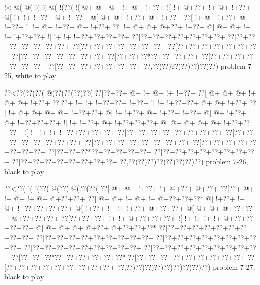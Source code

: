 \vbox{\vbox{\goo
\- !<\- @(\- @(\- !(\- !(\- @(\- !(\0??(
\- ![\- @+\- @+\- @+\- !+\- @+\- !+\0??+
\- ![\- !+\- @+\0??+\- !+\- @+\- !+\0??+
\- @[\- !+\- !+\- !+\0??+\- @+\- !+\0??+
\- @[\- @+\- @+\- !+\0??+\- @+\- !+\0??+
\0??[\- !+\- @+\- !+\0??+\- @+\- !+\0??+
\- ![\- !+\- @+\- !+\0??+\- @+\- !+\0??+
\0??[\- !+\- @+\- @+\- @+\0??+\- !+\0??+
\- @[\- @+\- @+\- !+\- !+\- !+\0??+\0??+
\- ![\- !+\- !+\- !+\0??+\0??+\0??+\0??+
\0??[\0??+\0??+\0??+\0??+\0??+\0??+\0??+
\0??[\0??+\0??+\0??+\0??+\0??+\0??+\0??+
\0??[\0??+\0??+\0??+\0??+\0??+\0??+\0??+
\0??[\0??+\0??+\0??+\0??+\0??+\0??+\0??+
\0??[\0??+\0??+\0??+\0??+\0??+\0??+\0??+
\0??[\0??+\0??+\0??*\0??+\0??+\0??+\0??+
\0??[\0??+\0??+\0??+\0??+\0??+\0??+\0??+
\0??[\0??+\0??+\0??+\0??+\0??+\0??+\0??+
\0??,\0??)\0??)\0??)\0??)\0??)\0??)\0??)
}
\hfil problem 7-25, white to play\hfil\break
}

\vbox{\vbox{\goo
\0??<\0??(\0??(\0??(\- @(\0??(\0??(\0??(\0??(
\0??[\0??+\0??+\- @+\- !+\- @+\- !+\- !+\0??+
\0??[\- @+\- @+\- @+\- !+\- @+\- @+\- !+\0??+
\0??[\0??+\- !+\- !+\- !+\0??+\0??+\- !+\0??+
\- ![\- !+\- !+\0??+\0??+\- @+\- @+\- !+\0??+
\0??[\- !+\- @+\- @+\- @+\- @+\- !+\0??+\0??+
\- @[\- !+\- !+\0??+\- @+\- !+\0??+\- !+\0??+
\- @[\- @+\- !+\0??+\- @+\- !+\0??+\0??+\0??+
\- ![\- !+\- !+\0??+\- @+\- !+\0??+\0??+\0??+
\- @[\- @+\- @+\- @+\- @+\- !+\0??+\0??+\0??+
\- ![\- !+\- !+\- !+\- !+\0??+\0??+\0??+\0??+
\0??[\0??+\0??+\0??+\0??+\0??+\0??+\0??+\0??+
\0??[\0??+\0??+\0??+\0??+\0??+\0??+\0??+\0??+
\0??[\0??+\0??+\0??+\0??+\0??+\0??+\0??+\0??+
\0??[\0??+\0??+\0??+\0??+\0??+\0??+\0??+\0??+
\0??[\0??+\0??+\0??*\0??+\0??+\0??+\0??+\0??+
\0??[\0??+\0??+\0??+\0??+\0??+\0??+\0??+\0??+
\0??[\0??+\0??+\0??+\0??+\0??+\0??+\0??+\0??+
\0??,\0??)\0??)\0??)\0??)\0??)\0??)\0??)\0??)
}
\hfil problem 7-26, black to play\hfil\break
}

\vbox{\vbox{\goo
\0??<\0??(\- !(\- !(\0??(\- @(\0??(\- @(\0??(\0??(
\0??[\- @+\- @+\- !+\0??+\- !+\- @+\0??+\- @+\0??+
\0??[\0??+\- @+\- !+\- @+\- !+\- @+\- @+\0??+\0??+
\0??[\- @+\- @+\- !+\- @+\- !+\- @+\0??+\0??+\0??*
\- @[\- !+\0??+\- !+\- @+\- !+\0??+\0??+\0??+\0??+
\- @[\- !+\0??+\- !+\- !+\- !+\0??+\- @+\0??+\0??+
\- @[\- @+\- @+\- @+\0??+\0??+\- @+\0??+\0??+\0??+
\0??[\0??+\0??+\0??+\- !+\- !+\- @+\0??+\0??+\0??+
\- ![\- !+\- !+\- !+\- !+\- @+\0??+\0??+\0??+\0??+
\- @[\- @+\- @+\- @+\- @+\0??+\- @+\0??+\0??+\0??*
\0??[\0??+\0??+\0??+\0??+\0??+\0??+\0??+\0??+\0??+
\0??[\0??+\0??+\0??+\0??+\0??+\0??+\0??+\0??+\0??+
\0??[\0??+\0??+\0??+\0??+\0??+\0??+\0??+\0??+\0??+
\0??[\0??+\0??+\0??+\0??+\0??+\0??+\0??+\0??+\0??+
\0??[\0??+\0??+\0??+\0??+\0??+\0??+\0??+\0??+\0??+
\0??[\0??+\0??+\0??*\0??+\0??+\0??+\0??+\0??+\0??*
\0??[\0??+\0??+\0??+\0??+\0??+\0??+\0??+\0??+\0??+
\0??[\0??+\0??+\0??+\0??+\0??+\0??+\0??+\0??+\0??+
\0??,\0??)\0??)\0??)\0??)\0??)\0??)\0??)\0??)\0??)
}
\hfil problem 7-27, black to play\hfil\break
}

